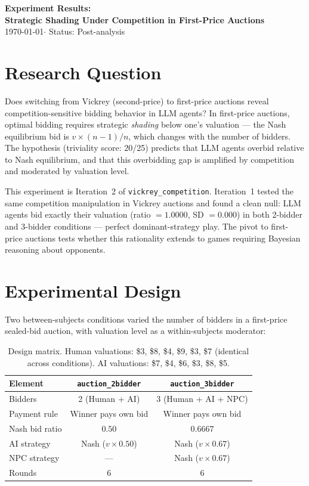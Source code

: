 \documentclass[11pt]{article}
\begin{document}
\begin{center}
{\Large \textbf{Experiment Results:\\Strategic Shading Under Competition in First-Price Auctions}}\\[0.5em]
{\large \today \quad $\cdot$ \quad Status: Post-analysis}
\end{center}

\section*{Research Question}

Does switching from Vickrey (second-price) to first-price auctions reveal competition-sensitive bidding behavior in LLM agents? In first-price auctions, optimal bidding requires strategic \emph{shading} below one's valuation --- the Nash equilibrium bid is $v \times (n{-}1)/n$, which changes with the number of bidders. The hypothesis (triviality score: 20/25) predicts that LLM agents overbid relative to Nash equilibrium, and that this overbidding gap is amplified by competition and moderated by valuation level.

This experiment is Iteration~2 of \texttt{vickrey\_competition}. Iteration~1 tested the same competition manipulation in Vickrey auctions and found a clean null: LLM agents bid exactly their valuation (ratio $= 1.0000$, SD $= 0.000$) in both 2-bidder and 3-bidder conditions --- perfect dominant-strategy play. The pivot to first-price auctions tests whether this rationality extends to games requiring Bayesian reasoning about opponents.

\section*{Experimental Design}

Two between-subjects conditions varied the number of bidders in a first-price sealed-bid auction, with valuation level as a within-subjects moderator:

\begin{table}[h!]
\centering
\begin{tabular}{@{}lcc@{}}
\toprule
Element & \texttt{auction\_2bidder} & \texttt{auction\_3bidder} \\
\midrule
Bidders & 2 (Human + AI) & 3 (Human + AI + NPC) \\
Payment rule & Winner pays own bid & Winner pays own bid \\
Nash bid ratio & $0.50$ & $0.6667$ \\
AI strategy & Nash ($v \times 0.50$) & Nash ($v \times 0.67$) \\
NPC strategy & --- & Nash ($v \times 0.67$) \\
Rounds & 6 & 6 \\
\bottomrule
\end{tabular}
\caption{Design matrix. Human valuations: \$3, \$8, \$4, \$9, \$3, \$7 (identical across conditions). AI valuations: \$7, \$4, \$6, \$3, \$8, \$5.}
\end{table}
\end{document}
